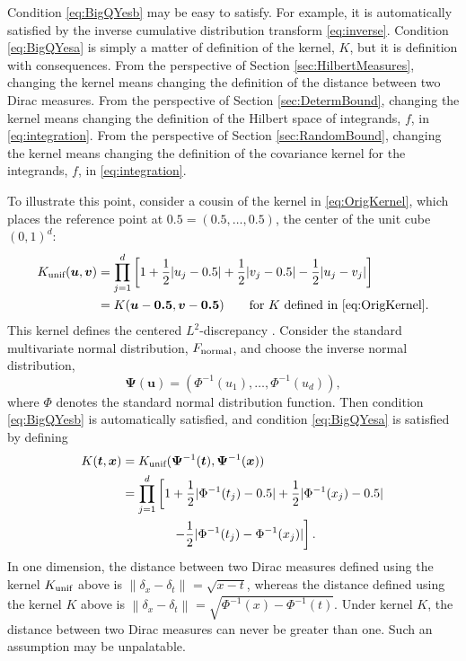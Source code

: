 \documentclass[graybox]{svmult}
\newcommand{\vx}{\boldsymbol{x}}
\newcommand{\vt}{\boldsymbol{t}}
\newcommand{\vu}{\boldsymbol{u}}
\newcommand{\vv}{\boldsymbol{v}}
\newcommand{\vPsi}{\boldsymbol{\Psi}}
\newcommand{\norm}[2][{}]{\ensuremath{\left \lVert #2 \right \rVert}_{#1}}
\newcommand{\unif}{\textup{unif}}
\newcommand{\normal}{\textup{normal}}
\begin{document}
Condition \eqref{eq:BigQYesb} may be easy to satisfy.  For example, it is automatically satisfied by the inverse cumulative distribution transform \eqref{eq:inverse}.  Condition \eqref{eq:BigQYesa} is simply a matter of definition of the kernel, $K$, but it is definition with consequences.  From the perspective of Section \ref{sec:HilbertMeasures}, changing the kernel means changing the definition of the distance between two Dirac measures.  From the perspective of Section \ref{sec:DetermBound}, changing the kernel means changing the definition of the Hilbert space of integrands, $f$, in \eqref{eq:integration}.   From the perspective of Section \ref{sec:RandomBound}, changing the kernel means changing the definition of the covariance kernel for the integrands, $f$, in \eqref{eq:integration}.

To illustrate this point, consider a cousin of the kernel in \eqref{eq:OrigKernel}, which places the reference point at $\boldsymbol{0.5} = (0.5, \ldots, 0.5)$, the center of the unit cube $(0,1)^d$:
\begin{align}
\label{eq:L2kernel}
    K_{\unif}(\vu,\vv) &= \prod_{j=1}^d\left[1+\frac{1}{2}|u_j-0.5|+\frac{1}{2}|v_j-0.5|-\frac{1}{2}|u_j-v_j|\right] \\
    \nonumber
    & = K(\vu - \boldsymbol{0.5}, \vv - \boldsymbol{0.5}) \qquad \text{for $K$ defined in \eqref{eq:OrigKernel}}. 
\end{align}
This kernel defines the centered $L^2$-discrepancy \cite{Hic97a}.
Consider the standard multivariate normal distribution, $F_\normal$, and choose the inverse normal distribution,
\begin{equation*}
    \vPsi(\vu) = (\Phi^{-1}(u_1), \ldots, \Phi^{-1}(u_d)),
\end{equation*}
where $\Phi$ denotes the standard normal distribution function.  Then condition \eqref{eq:BigQYesb} is automatically satisfied, and condition \eqref{eq:BigQYesa} is  satisfied by defining
\begin{align}
\nonumber
     K(\vt,\vx) &= K_{\unif}(\vPsi^{-1}(\vt),\vPsi^{-1}(\vx)) \\
     \nonumber
      &= \prod_{j=1}^d\left[1+\frac{1}{2}|\Phi^{-1}(t_j)-0.5|+\frac{1}{2}|\Phi^{-1}(x_j)-0.5| \right . \\
      & \qquad \qquad \left . -\frac{1}{2}|\Phi^{-1}(t_j)-\Phi^{-1}(x_j)|\right].
\end{align}
In one dimension, the distance between two Dirac measures defined using the kernel $K_\unif$ above is $\norm{\delta_{x} - \delta_{t}} = \sqrt{x-t}$, whereas the distance defined using the kernel $K$ above is $\norm{\delta_{x} - \delta_{t}} = \sqrt{\Phi^{-1}(x)-\Phi^{-1}(t)}$.  Under kernel $K$, the distance between two Dirac measures can never be greater than one.  Such an assumption may be unpalatable.
\end{document}
